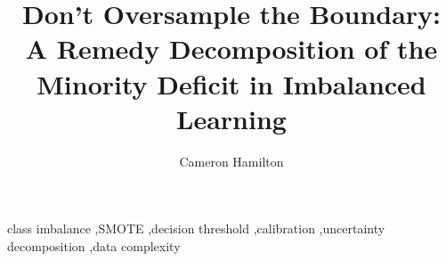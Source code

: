\documentclass[preprint,12pt]{elsarticle}
\begin{document}
\begin{frontmatter}

\title{Don't Oversample the Boundary: A Remedy Decomposition of the Minority
Deficit in Imbalanced Learning}

\author[a]{Cameron Hamilton}

\begin{abstract}

\end{abstract}

\begin{keyword}
class imbalance \sep SMOTE \sep decision threshold \sep calibration
\sep uncertainty decomposition \sep data complexity
\end{keyword}

\end{frontmatter}















\end{document}
